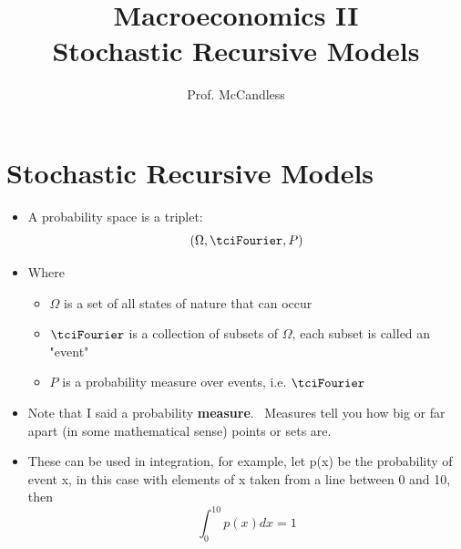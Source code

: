 \documentclass[notes=show]{beamer}
\begin{document}
\title{Macroeconomics II\\
Stochastic Recursive Models}
\author{Prof. McCandless}
\maketitle

\section{Stochastic Recursive Models}

\begin{frame}%


\begin{itemize}
\item A probability space is a triplet:%
\[
\left( \Omega ,\tciFourier ,P\right) 
\]

\item Where

\begin{itemize}
\item $\Omega $ is a set of all states of nature that can occur

\item $\tciFourier $ is a collection of subsets of $\Omega $, each subset is
called an "event"

\item $P$ is a probability measure over events, i.e. $\tciFourier $
\end{itemize}

\item Note that I said a probability \textbf{measure}. \ Measures tell you
how big or far apart (in some mathematical sense) points or sets are.

\item These can be used in integration, for example, let p(x) be the
probability of event x, in this case with elements of x taken from a line
between 0 and 10, then \ 
\[
\int_{0}^{10}p(x)dx=1
\]
\end{itemize}

\end{frame}%
\end{document}
